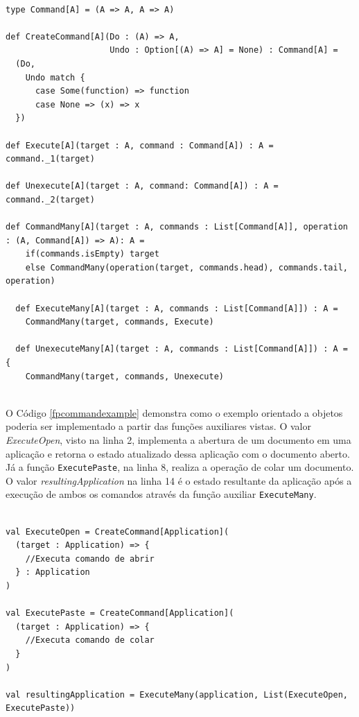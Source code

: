 \begin{lstlisting}[caption={\textit{Command} Funcional.},label=fpcommand]
    
type Command[A] = (A => A, A => A)

def CreateCommand[A](Do : (A) => A,
                     Undo : Option[(A) => A] = None) : Command[A] =
  (Do,
    Undo match {
      case Some(function) => function
      case None => (x) => x
  })

def Execute[A](target : A, command : Command[A]) : A = command._1(target)

def Unexecute[A](target : A, command: Command[A]) : A = command._2(target)

def CommandMany[A](target : A, commands : List[Command[A]], operation : (A, Command[A]) => A): A =
    if(commands.isEmpty) target
    else CommandMany(operation(target, commands.head), commands.tail, operation)

  def ExecuteMany[A](target : A, commands : List[Command[A]]) : A =
    CommandMany(target, commands, Execute)

  def UnexecuteMany[A](target : A, commands : List[Command[A]]) : A = {
    CommandMany(target, commands, Unexecute)
    
\end{lstlisting}

O Código \ref{fpcommandexample} demonstra como o exemplo 
orientado a objetos poderia ser implementado a partir das 
funções auxiliares vistas. O valor \textit{ExecuteOpen}, visto 
na linha 2, implementa a abertura de um documento em uma 
aplicação e retorna o estado atualizado dessa aplicação 
com o documento aberto. Já a função \texttt{ExecutePaste}, na 
linha 8, realiza a operação de colar um documento. 
O valor \textit{resultingApplication} na linha 14 é o estado 
resultante da aplicação após a execução de ambos os 
comandos através da função auxiliar \texttt{ExecuteMany}.

\begin{lstlisting}[caption={Exemplo funcional de \textit{Command}.},label=fpcommandexample]
    
val ExecuteOpen = CreateCommand[Application](
  (target : Application) => {
    //Executa comando de abrir
  } : Application
)

val ExecutePaste = CreateCommand[Application](
  (target : Application) => {
    //Executa comando de colar
  }
)
  
val resultingApplication = ExecuteMany(application, List(ExecuteOpen, ExecutePaste))
    
\end{lstlisting}


